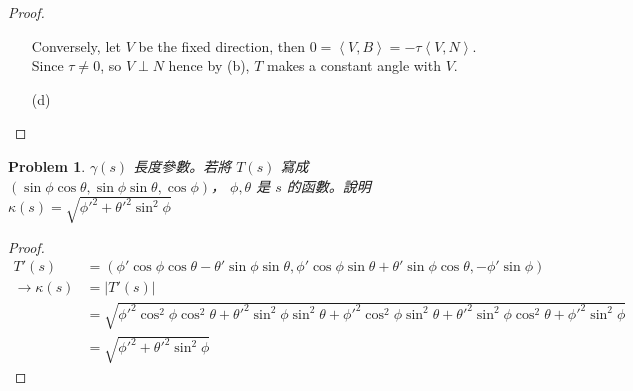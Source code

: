 \documentclass[10pt,a4paper]{article}
\newcounter{theProblemCounter}
\newtheorem{problem}[theProblemCounter]{Problem}
\begin{document}
\begin{proof}
\begin{enumerate}
Conversely, let $V$ be the fixed direction, then $0=\left\langle V, B\right\rangle = -\tau\left\langle V, N\right\rangle$. Since $\tau\ne 0$, so $V\perp N$ hence by (b), $T$ makes a constant angle with $V$.
\item[(d)]
\end{enumerate}
\end{proof}

\setcounter{theProblemCounter}{5}
\begin{problem}
$\gamma(s)$ 長度參數。若將 $T(s)$ 寫成 $(\sin\phi\cos\theta, \sin\phi\sin\theta, \cos\phi)$， $\phi,\theta$ 是 $s$ 的函數。說明 $\kappa(s)=\sqrt{\phi'^2+\theta'^2\sin^2\phi}$
\end{problem}
\begin{proof}
\begin{align*}
T'(s)&=(\phi'\cos\phi\cos\theta-\theta'\sin\phi\sin\theta,\phi'\cos\phi\sin\theta+\theta'\sin\phi\cos\theta,-\phi'\sin\phi)\\
\rightarrow\kappa(s)&=\left|T'(s)\right|\\
&=\sqrt{\phi'^2\cos^2\phi\cos^2\theta+\theta'^2\sin^2\phi\sin^2\theta+\phi'^2\cos^2\phi\sin^2\theta+\theta'^2\sin^2\phi\cos^2\theta+\phi'^2\sin^2\phi}\\
&=\sqrt{\phi'^2+\theta'^2\sin^2\phi}
\end{align*}
\end{proof}
\end{document}
